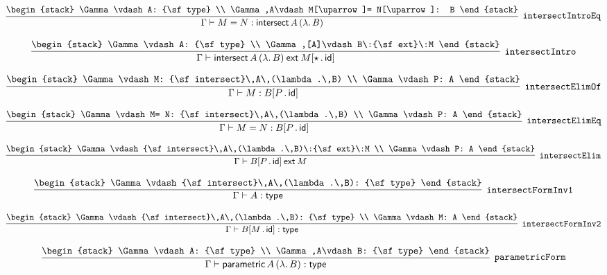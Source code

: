 \[
\infer[{\tt intersectIntroEq}]{\Gamma \vdash M= N: {\sf intersect}\,A\,(\lambda .\,B)}{
\begin{stack}
\Gamma \vdash A: {\sf type}
\\
\Gamma ,A\vdash M[\uparrow ]= N[\uparrow ]: B
\end{stack}}
\]

\[
\infer[{\tt intersectIntro}]{\Gamma \vdash {\sf intersect}\,A\,(\lambda .\,B)\:{\sf ext}\:M[\star \,.\,{\sf id}]}{
\begin{stack}
\Gamma \vdash A: {\sf type}
\\
\Gamma ,[A]\vdash B\:{\sf ext}\:M
\end{stack}}
\]

\[
\infer[{\tt intersectElimOf}]{\Gamma \vdash M: B[P\,.\,{\sf id}]}{
\begin{stack}
\Gamma \vdash M: {\sf intersect}\,A\,(\lambda .\,B)
\\
\Gamma \vdash P: A
\end{stack}}
\]

\[
\infer[{\tt intersectElimEq}]{\Gamma \vdash M= N: B[P\,.\,{\sf id}]}{
\begin{stack}
\Gamma \vdash M= N: {\sf intersect}\,A\,(\lambda .\,B)
\\
\Gamma \vdash P: A
\end{stack}}
\]

\[
\infer[{\tt intersectElim}]{\Gamma \vdash B[P\,.\,{\sf id}]\:{\sf ext}\:M}{
\begin{stack}
\Gamma \vdash {\sf intersect}\,A\,(\lambda .\,B)\:{\sf ext}\:M
\\
\Gamma \vdash P: A
\end{stack}}
\]

\[
\infer[{\tt intersectFormInv1}]{\Gamma \vdash A: {\sf type}}{
\begin{stack}
\Gamma \vdash {\sf intersect}\,A\,(\lambda .\,B): {\sf type}
\end{stack}}
\]

\[
\infer[{\tt intersectFormInv2}]{\Gamma \vdash B[M\,.\,{\sf id}]: {\sf type}}{
\begin{stack}
\Gamma \vdash {\sf intersect}\,A\,(\lambda .\,B): {\sf type}
\\
\Gamma \vdash M: A
\end{stack}}
\]

\[
\infer[{\tt parametricForm}]{\Gamma \vdash {\sf parametric}\,A\,(\lambda .\,B): {\sf type}}{
\begin{stack}
\Gamma \vdash A: {\sf type}
\\
\Gamma ,A\vdash B: {\sf type}
\end{stack}}
\]

